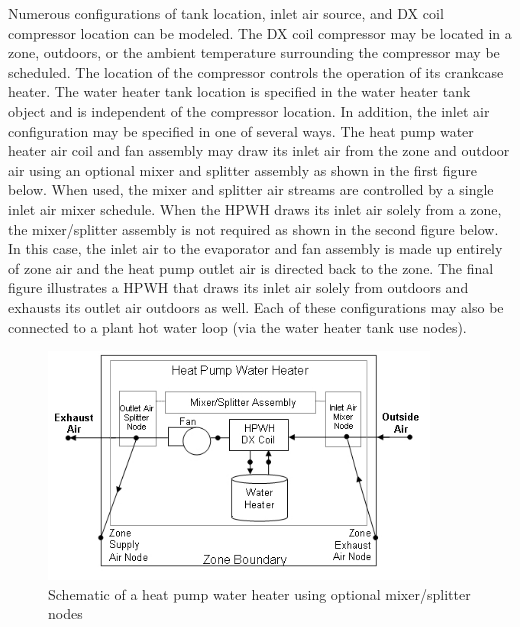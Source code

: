 Numerous configurations of tank location, inlet air source, and DX coil compressor location can be modeled. The DX coil compressor may be located in a zone, outdoors, or the ambient temperature surrounding the compressor may be scheduled. The location of the compressor controls the operation of its crankcase heater. The water heater tank location is specified in the water heater tank object and is independent of the compressor location. In addition, the inlet air configuration may be specified in one of several ways. The heat pump water heater air coil and fan assembly may draw its inlet air from the zone and outdoor air using an optional mixer and splitter assembly as shown in the first figure below. When used, the mixer and splitter air streams are controlled by a single inlet air mixer schedule. When the HPWH draws its inlet air solely from a zone, the mixer/splitter assembly is not required as shown in the second figure below. In this case, the inlet air to the evaporator and fan assembly is made up entirely of zone air and the heat pump outlet air is directed back to the zone. The final figure illustrates a HPWH that draws its inlet air solely from outdoors and exhausts its outlet air outdoors as well. Each of these configurations may also be connected to a plant hot water loop (via the water heater tank use nodes).

\begin{figure}[hbtp] %
\centering
\includegraphics[width=0.9\textwidth, height=0.9\textheight, keepaspectratio=true]{media/image6855.png}
\caption{Schematic of a heat pump water heater using optional mixer/splitter nodes \protect \label{fig:schematic-of-a-heat-pump-water-heater-using-001}}
\end{figure}


